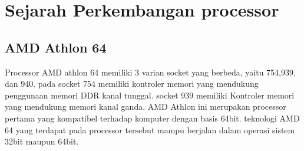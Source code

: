 \section{Sejarah Perkembangan processor}
	\subsection{AMD Athlon 64}
		Processor AMD athlon 64 memiliki 3 varian socket yang berbeda, yaitu 754,939, dan 940. pada socket 754 memiliki kontroler memori yang mendukung penggunaan memori DDR kanal tunggal. socket 939 memiliki Kontroler memori yang mendukung memori kanal ganda. AMD Athlon ini merupakan processor pertama yang kompatibel terhadap komputer dengan basis 64bit.  teknologi AMD 64 yang terdapat pada processor tersebut mampu berjalan dalam operasi sistem 32bit maupun 64bit.